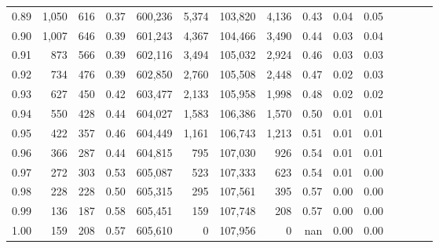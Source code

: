 \begin{tabular}{rrrcrrrrrrrrrrr}
0.89 &   1,050 &    616 &                                       0.37 &  600,236 &    5,374 &  103,820 &    4,136 &  0.43 &  0.04 &                         0.05 \\
0.90 &   1,007 &    646 &                                       0.39 &  601,243 &    4,367 &  104,466 &    3,490 &  0.44 &  0.03 &                         0.04 \\
0.91 &     873 &    566 &                                       0.39 &  602,116 &    3,494 &  105,032 &    2,924 &  0.46 &  0.03 &                         0.03 \\
0.92 &     734 &    476 &                                       0.39 &  602,850 &    2,760 &  105,508 &    2,448 &  0.47 &  0.02 &                         0.03 \\
0.93 &     627 &    450 &                                       0.42 &  603,477 &    2,133 &  105,958 &    1,998 &  0.48 &  0.02 &                         0.02 \\
0.94 &     550 &    428 &                                       0.44 &  604,027 &    1,583 &  106,386 &    1,570 &  0.50 &  0.01 &                         0.01 \\
0.95 &     422 &    357 &                                       0.46 &  604,449 &    1,161 &  106,743 &    1,213 &  0.51 &  0.01 &                         0.01 \\
0.96 &     366 &    287 &                                       0.44 &  604,815 &      795 &  107,030 &      926 &  0.54 &  0.01 &                         0.01 \\
0.97 &     272 &    303 &                                       0.53 &  605,087 &      523 &  107,333 &      623 &  0.54 &  0.01 &                         0.00 \\
0.98 &     228 &    228 &                                       0.50 &  605,315 &      295 &  107,561 &      395 &  0.57 &  0.00 &                         0.00 \\
0.99 &     136 &    187 &                                       0.58 &  605,451 &      159 &  107,748 &      208 &  0.57 &  0.00 &                         0.00 \\
1.00 &     159 &    208 &                                       0.57 &  605,610 &        0 &  107,956 &        0 &   nan &  0.00 &                         0.00 \\
\bottomrule
\end{tabular}

